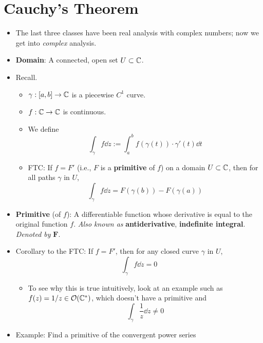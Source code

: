 \documentclass[../notes.tex]{subfiles}
\begin{document}
\section{Cauchy's Theorem}
\begin{itemize}
    \item {}The last three classes have been real analysis with complex numbers; now we get into \emph{complex} analysis.
    \item \textbf{Domain}: A connected, open set $U\subset\mathbb{C}$.
    \item Recall.
    \begin{itemize}
        \item $\gamma:[a,b]\to\mathbb{C}$ is a piecewise $C^1$ curve.
        \item $f:\mathbb{C}\to\mathbb{C}$ is continuous.
        \item We define
        \begin{equation*}
            \int_\gamma f\dd{z} := \int_a^bf(\gamma(t))\cdot\gamma'(t)\dd{t}
        \end{equation*}
        \item FTC: If $f=F'$ (i.e., $F$ is a \textbf{primitive} of $f$) on a domain $U\subset\mathbb{C}$, then for all paths $\gamma$ in $U$,
        \begin{equation*}
            \int_\gamma f\dd{z} = F(\gamma(b))-F(\gamma(a))
        \end{equation*}
    \end{itemize}
    \item \textbf{Primitive} (of $f$): A differentiable function whose derivative is equal to the original function $f$. \emph{Also known as} \textbf{antiderivative}, \textbf{indefinite integral}. \emph{Denoted by} $\bm{F}$.
    \item Corollary to the FTC: If $f=F'$, then for any closed curve $\gamma$ in $U$,
    \begin{equation*}
        \int_\gamma f\dd{z} = 0
    \end{equation*}
    \begin{itemize}
        \item To see why this is true intuitively, look at an example such as $f(z)=1/z\in\mathcal{O}(\mathbb{C}^*)$, which doesn't have a primitive and
        \begin{equation*}
            \int_\gamma\frac{1}{z}\dd{z} \neq 0
        \end{equation*}
    \end{itemize}
    \item Example: Find a primitive of the convergent power series

\end{itemize}
\end{document}
